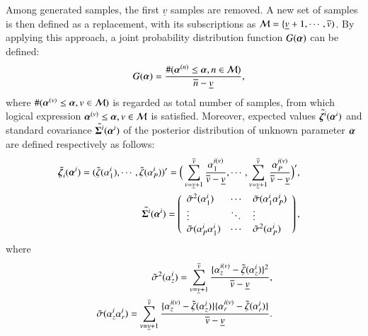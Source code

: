 \documentclass[a4paper,oneside,onecolumn,preprint,10pt,authoryear]{elsarticle}
\begin{document}
Among generated samples, the first $\underline{v}$ samples are removed. A new set of samples is then defined as a replacement, with its subscriptions as ${\cal M}=\{\underline{v}+1,\cdots,\overline{v})$. By applying this approach, a joint probability distribution function $G(\mbox{\boldmath$\alpha$})$ can be defined: 
  \begin{eqnarray}
 && G(\mbox{\boldmath$\alpha$})
      =\frac{\mbox{\#}(\mbox{\boldmath$\alpha$}^{(n)}
      \leq \mbox{\boldmath$\alpha$}, n\in {\cal M})}
      {\overline{n}-\underline{v}},
   \end{eqnarray}
where $\mbox{\#}(\mbox{\boldmath$\alpha$}^{(v)} \leq \mbox{\boldmath$\alpha$}, v\in {\cal M})$ is regarded as total number of samples, from which logical expression $\mbox{\boldmath$\alpha$}^{(v)} \leq \mbox{\boldmath$\alpha$}, v\in {\cal M}$ is satisfied. Moreover, expected values  $\tilde{\mbox{\boldmath$\zeta$}^i}(\mbox{\boldmath$\alpha$}^i)$ and standard covariance $\tilde{\mbox{\boldmath$\Sigma$}^i}(\mbox{\boldmath$\alpha$}^i)$ of the posterior distribution of unknown parameter $\mbox{\boldmath$\alpha$}$ are defined respectively as follows:
%
   \begin{eqnarray}
      && \hspace{-7mm}
      \tilde{\mbox{\boldmath$\zeta$}_i}(\mbox{\boldmath$\alpha$}^i)=
      (\tilde{\zeta}(\alpha^i_1),\cdots,\tilde{\zeta}
      (\alpha^i_P))^\prime =\Big(\sum_{v=\underline{v}+1}^{\overline{v}}
      \frac{\alpha_1^{i(v)}}{\overline{v}-\underline{v}},
      \cdots, \sum_{v=\underline{v}+1}^{\overline{v}}
      \frac{\alpha_P^{i(v)}}{\overline{v}-\underline{v}}\Big)^\prime,
      \label{mu3} \\
      && \hspace{-7mm}
      \tilde{\mbox{\boldmath$\Sigma$}^i}(\mbox{\boldmath$\alpha$}^i)=
      \left(
      \begin{array}{lll}
         \tilde{\sigma}^2(\alpha^i_1) & \cdots
            & \tilde{\sigma}(\alpha^i_1\alpha^i_P) \\
         \vdots & \ddots & \vdots \\
         \tilde{\sigma}(\alpha^i_P\alpha^i_1) & \cdots
            & \tilde{\sigma}^2(\alpha^i_P) \\
      \end{array}
      \right),
      \label{mu4}
   \end{eqnarray}
where
%
   \begin{eqnarray}
      && \hspace{-3mm} \tilde{\sigma}^2(\alpha^i_z)=
      \sum_{v=\underline{v}+1}^{\overline{v}}
      \frac{\{\alpha_z^{i(v)}-\tilde{\zeta}(\alpha^i_z)\}^2}
      {\overline{v}-\underline{v}}, \\
      && \hspace{-3mm} \tilde{\sigma}(\alpha^i_z\alpha^i_r) 
       =\sum_{v=\underline{v}+1}^{\overline{v}}
      \frac{\{\alpha_z^{i(v)}-\tilde{\zeta}(\alpha^i_z)\}
      \{\alpha_r^{i(v)}-\tilde{\zeta}(\alpha^i_r)\}}{\overline{v}-\underline{v}}.
      \nonumber 
    \end{eqnarray}
\end{document}
